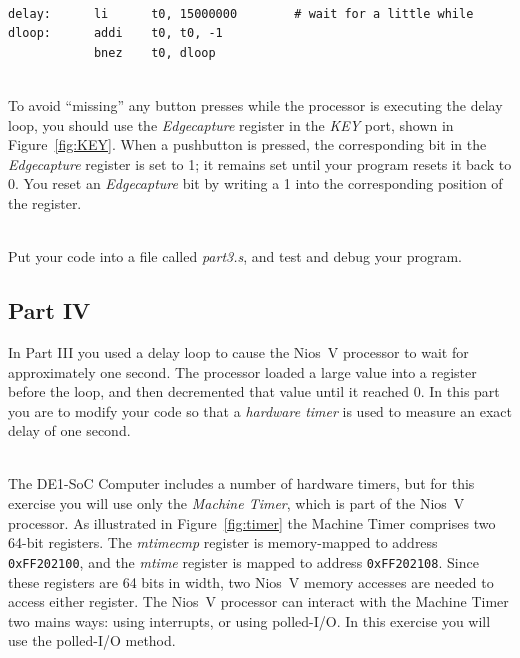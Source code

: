 \documentclass[epsfig,10pt,fullpage]{article}
\begin{document}
~\\
\noindent
\begin{lstlisting}[style=defaultNiosVStyle]
delay:      li      t0, 15000000        # wait for a little while
dloop:      addi    t0, t0, -1
            bnez    t0, dloop
\end{lstlisting}

~\\
\noindent
To avoid ``missing'' any button presses while the processor is executing the delay loop, you
should use the {\it Edgecapture} register in the {\it KEY} port, shown in Figure~\ref{fig:KEY}.
When a pushbutton is pressed, the corresponding bit in the {\it Edgecapture} register is
set to 1; it remains set until your program resets it back to 0. You reset an {\it
Edgecapture} bit by writing a 1 into the corresponding position of the register.

~\\
\noindent
Put your code into a file called {\it part3.s}, and test and debug your program.

\subsection*{Part IV}

\noindent
In Part III you used a delay loop to cause the Nios~V processor to wait for approximately one
second. The processor loaded a large value into a register before the loop, and then 
decremented that value until it reached 0.  In this part you are to modify your code so that a
{\it hardware timer} is used to measure an exact delay of one second. 

~\\
\noindent
The DE1-SoC Computer includes a number of hardware timers, but for this exercise you will
use only the {\it Machine Timer}, which is part of the Nios~V processor. As illustrated
in Figure~\ref{fig:timer} the Machine Timer comprises two 64-bit registers. 
The {\it mtimecmp} register is memory-mapped to address \texttt{0xFF202100}, and the 
{\it mtime} register is mapped to address \texttt{0xFF202108}. Since these registers are
64 bits in width, two Nios~V memory accesses are needed to access either register. The
Nios~V processor can interact with the Machine Timer two mains ways: using interrupts, or
using polled-I/O. In this exercise you will use the polled-I/O method.
\end{document}
